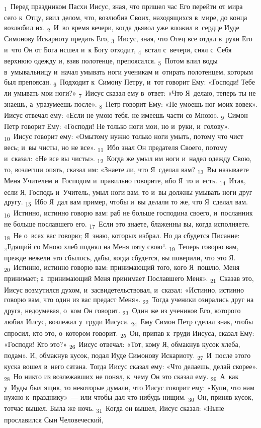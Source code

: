 \documentclass[a4paper,12pt]{article}
\begin{document}
\textsubscript{1}~Перед праздником Пасхи Иисус, зная, что пришел час Его перейти от мира сего к~Отцу, явил делом, что, возлюбив Своих, находящихся в~мире, до конца возлюбил их. \textsubscript{2}~И~во время вечери, когда дьявол уже вложил в~сердце Иуде Симонову Искариоту предать Его, \textsubscript{3}~Иисус, зная, что Отец все отдал в~руки Его и~что Он от Бога исшел и~к Богу отходит, \textsubscript{4}~встал с~вечери, снял с~Себя верхнюю одежду и, взяв полотенце, препоясался. \textsubscript{5}~Потом влил воды в~умывальницу и~начал умывать ноги ученикам и~отирать полотенцем, которым был препоясан. \textsubscript{6}~Подходит к~Симону Петру, и~тот говорит Ему: «Господи! Тебе ли умывать мои ноги?» \textsubscript{7}~Иисус сказал ему в~ответ: «Что Я~делаю, теперь ты не знаешь, а~уразумеешь после». \textsubscript{8}~Петр говорит Ему: «Не умоешь ног моих вовек». Иисус отвечал ему: «Если не умою тебя, не имеешь части со Мною». \textsubscript{9}~Симон Петр говорит Ему: «Господи! Не только ноги мои, но и~руки, и~голову». \textsubscript{10}~Иисус говорит ему: «Омытому нужно только ноги умыть, потому что чист весь; и~вы чисты, но не все». \textsubscript{11}~Ибо знал Он предателя Своего, потому и~сказал: «Не все вы чисты». \textsubscript{12}~Когда же умыл им ноги и~надел одежду Свою, то, возлегши опять, сказал им: «Знаете ли, что Я~сделал вам? \textsubscript{13}~Вы называете Меня Учителем и~Господом и~правильно говорите, ибо Я~то и~есть. \textsubscript{14}~Итак, если Я, Господь и~Учитель, умыл ноги вам, то и~вы должны умывать ноги друг другу. \textsubscript{15}~Ибо Я~дал вам пример, чтобы и~вы делали то же, что Я~сделал вам. \textsubscript{16}~Истинно, истинно говорю вам: раб не больше господина своего, и~посланник не больше пославшего его. \textsubscript{17}~Если это знаете, блаженны вы, когда исполняете. \textsubscript{18}~Не о~всех вас говорю; Я~знаю, которых избрал. Но да сбудется Писание: „Едящий со Мною хлеб поднял на Меня пяту свою“. \textsubscript{19}~Теперь говорю вам, прежде нежели это сбылось, дабы, когда сбудется, вы поверили, что это Я. \textsubscript{20}~Истинно, истинно говорю вам: принимающий того, кого Я~пошлю, Меня принимает; а~принимающий Меня принимает Пославшего Меня». \textsubscript{21}~Сказав это, Иисус возмутился духом, и~засвидетельствовал, и~сказал: «Истинно, истинно говорю вам, что один из вас предаст Меня». \textsubscript{22}~Тогда ученики озирались друг на друга, недоумевая, о~ком Он говорит. \textsubscript{23}~Один же из учеников Его, которого любил Иисус, возлежал у~груди Иисуса. \textsubscript{24}~Ему Симон Петр сделал знак, чтобы спросил, кто это, о~котором говорит. \textsubscript{25}~Он, припав к~груди Иисуса, сказал Ему: «Господи! Кто это?» \textsubscript{26}~Иисус отвечал: «Тот, кому Я, обмакнув кусок хлеба, подам». И, обмакнув кусок, подал Иуде Симонову Искариоту. \textsubscript{27}~И~после этого куска вошел в~него сатана. Тогда Иисус сказал ему: «Что делаешь, делай скорее». \textsubscript{28}~Но никто из возлежавших не понял, к~чему Он это сказал ему. \textsubscript{29}~А~как у~Иуды был ящик, то некоторые думали, что Иисус говорит ему: «Купи, что нам нужно к~празднику»~--- или чтобы дал что-нибудь нищим. \textsubscript{30}~Он, приняв кусок, тотчас вышел. Была же ночь. \textsubscript{31}~Когда он вышел, Иисус сказал: «Ныне прославился Сын Человеческий, 
\end{document}
